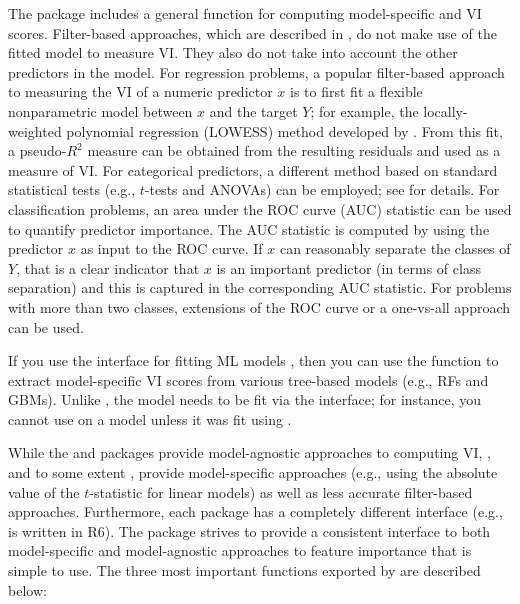 The  package \citep{R-caret} includes a general
 function for computing model-specific and
 VI scores. Filter-based approaches, which are
described in \citet{applied-kuhn-2013}, do not make use of the fitted
model to measure VI. They also do not take into account the other
predictors in the model. For regression problems, a popular filter-based
approach to measuring the VI of a numeric predictor \(x\) is to first
fit a flexible nonparametric model between \(x\) and the target \(Y\);
for example, the locally-weighted polynomial regression (LOWESS) method
developed by \citet{robust-cleveland-1979}. From this fit, a
pseudo-\(R^2\) measure can be obtained from the resulting residuals and
used as a measure of VI. For categorical predictors, a different method
based on standard statistical tests (e.g., \(t\)-tests and ANOVAs) can
be employed; see \citet{applied-kuhn-2013} for details. For
classification problems, an area under the ROC curve (AUC) statistic can
be used to quantify predictor importance. The AUC statistic is computed
by using the predictor \(x\) as input to the ROC curve. If \(x\) can
reasonably separate the classes of \(Y\), that is a clear indicator that
\(x\) is an important predictor (in terms of class separation) and this
is captured in the corresponding AUC statistic. For problems with more
than two classes, extensions of the ROC curve or a one-vs-all approach
can be used.

If you use the  interface for fitting ML models
\citep{R-mlr}, then you can use the 
function to extract model-specific VI scores from various tree-based
models (e.g., RFs and GBMs). Unlike , the model needs to be
fit via the  interface; for instance, you cannot use
 on a  model unless it was fit
using .

While the  and  packages provide model-agnostic
approaches to computing VI, , and to some extent ,
provide model-specific approaches (e.g., using the absolute value of the
\(t\)-statistic for linear models) as well as less accurate filter-based
approaches. Furthermore, each package has a completely different
interface (e.g.,  is written in R6). The  package
\citep{R-vip} strives to provide a consistent interface to both
model-specific and model-agnostic approaches to feature importance that
is simple to use. The three most important functions exported by
 are described below:

